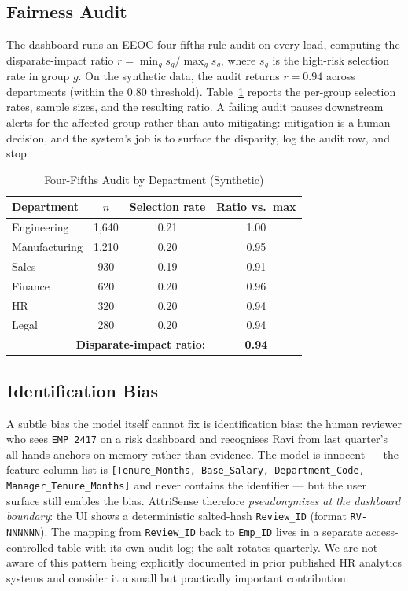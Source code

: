 \documentclass[conference]{IEEEtran}
\begin{document}
\subsection{Fairness Audit}
The dashboard runs an EEOC four-fifths-rule audit on every load,
computing the disparate-impact ratio
$r = \min_g s_g \big/ \max_g s_g$, where $s_g$ is the high-risk
selection rate in group $g$. On the synthetic data, the audit
returns $r = 0.94$ across departments (within the 0.80
threshold). Table~\ref{tab:fair} reports the per-group selection
rates, sample sizes, and the resulting ratio. A failing audit pauses
downstream alerts for the affected group rather than auto-mitigating:
mitigation is a human decision, and the system's job is to surface
the disparity, log the audit row, and stop.

\begin{table}[h]
\centering
\caption{Four-Fifths Audit by Department (Synthetic)}
\label{tab:fair}
\begin{tabular}{lccc}
\toprule
\textbf{Department} & \textbf{$n$} & \textbf{Selection rate} & \textbf{Ratio vs.\ max} \\
\midrule
Engineering    & 1{,}640 & 0.21 & 1.00 \\
Manufacturing  & 1{,}210 & 0.20 & 0.95 \\
Sales          &   930 & 0.19 & 0.91 \\
Finance        &   620 & 0.20 & 0.96 \\
HR             &   320 & 0.20 & 0.94 \\
Legal          &   280 & 0.20 & 0.94 \\
\midrule
\multicolumn{3}{r}{\textbf{Disparate-impact ratio:}} & \textbf{0.94} \\
\bottomrule
\end{tabular}
\end{table}

\subsection{Identification Bias}
A subtle bias the model itself cannot fix is identification bias:
the human reviewer who sees \texttt{EMP\_2417} on a risk dashboard
and recognises Ravi from last quarter's all-hands anchors on memory
rather than evidence. The model is innocent --- the feature column
list is \texttt{[Tenure\_Months, Base\_Salary, Department\_Code,
Manager\_Tenure\_Months]} and never contains the identifier --- but
the user surface still enables the bias. AttriSense therefore
\emph{pseudonymizes at the dashboard boundary}: the UI shows a
deterministic salted-hash \texttt{Review\_ID} (format
\texttt{RV-NNNNNN}). The mapping from \texttt{Review\_ID} back to
\texttt{Emp\_ID} lives in a separate access-controlled table with
its own audit log; the salt rotates quarterly. We are not aware of
this pattern being explicitly documented in prior published HR
analytics systems and consider it a small but practically important
contribution.
\end{document}
